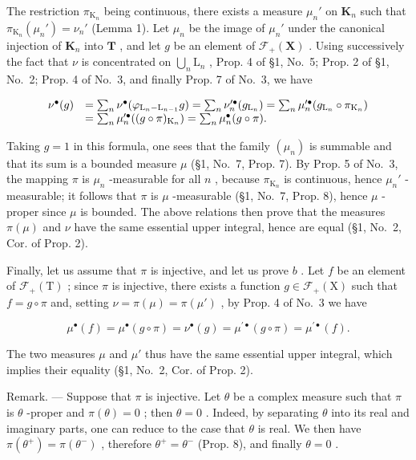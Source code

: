 The restriction \(\pi_{\mathrm{K}_n}\) being continuous, there exists a measure \(\mu_n'\) on \(\mathbf{K}_n\) such that \(\pi_{\mathrm{K}_n}(\mu_n') = \nu_n'\) (Lemma 1). Let \(\mu_n\) be the image of \(\mu_n'\) under the canonical injection of \(\mathbf{K}_n\) into \(\mathbf{T}\) , and let \(g\) be an element of \(\mathcal{F}_{+}(\mathbf{X})\) . Using successively the fact that \(\nu\) is concentrated on \(\bigcup_{n} \mathrm{L}_n\) , Prop. 4 of §1, No.~5; Prop. 2 of §1, No.~2; Prop. 4 of No.~3, and finally Prop. 7 of No.~3, we have

\[
\begin{array}{r l} \nu^ {\bullet} (g) & = \sum_ {n} \nu^ {\bullet} (\varphi_ {\mathrm{L} _ {n} - \mathrm{L} _ {n - 1}} g) = \sum_ {n} \nu_ {n} ^ {\prime   \bullet} (g _ {\mathrm{L} _ {n}}) = \sum_ {n} \mu_ {n} ^ {\prime   \bullet} (g _ {\mathrm{L} _ {n}} \circ \pi_ {\mathrm{K} _ {n}}) \\ & = \sum_ {n} \mu_ {n} ^ {\prime   \bullet} ((g \circ \pi) _ {\mathrm{K} _ {n}}) = \sum_ {n} \mu_ {n} ^ {\bullet} (g \circ \pi). \end{array}
\]

Taking \(g = 1\) in this formula, one sees that the family \((\mu_n)\) is summable and that its sum is a bounded measure \(\mu\) (§1, No.~7, Prop. 7). By Prop. 5 of No.~3, the mapping \(\pi\) is \(\mu_n\) -measurable for all \(n\) , because \(\pi_{\mathrm{K}_n}\) is continuous, hence \(\mu_n'\) -measurable; it follows that \(\pi\) is \(\mu\) -measurable (§1, No.~7, Prop. 8), hence \(\mu\) -proper since \(\mu\) is bounded. The above relations then prove that the measures \(\pi(\mu)\) and \(\nu\) have the same essential upper integral, hence are equal (§1, No.~2, Cor. of Prop. 2).

Finally, let us assume that \(\pi\) is injective, and let us prove \(b\) . Let \(f\) be an element of \(\mathcal{F}_{+}(\mathrm{T})\) ; since \(\pi\) is injective, there exists a function \(g \in \mathcal{F}_{+}(\mathrm{X})\) such that \(f = g \circ \pi\) and, setting \(\nu = \pi(\mu) = \pi(\mu')\) , by Prop. 4 of No.~3 we have

\[
\mu^ {\bullet} (f) = \mu^ {\bullet} (g \circ \pi) = \nu^ {\bullet} (g) = \mu^ {\prime \bullet} (g \circ \pi) = \mu^ {\prime \bullet} (f).
\]

The two measures \(\mu\) and \(\mu'\) thus have the same essential upper integral, which implies their equality (§1, No.~2, Cor. of Prop. 2).

Remark. --- Suppose that \(\pi\) is injective. Let \(\theta\) be a complex measure such that \(\pi\) is \(\theta\) -proper and \(\pi(\theta)=0\) ; then \(\theta=0\) . Indeed, by separating \(\theta\) into its real and imaginary parts, one can reduce to the case that \(\theta\) is real. We then have \(\pi(\theta^{+})=\pi(\theta^{-})\) , therefore \(\theta^{+}=\theta^{-}\) (Prop. 8), and finally \(\theta=0\) .

